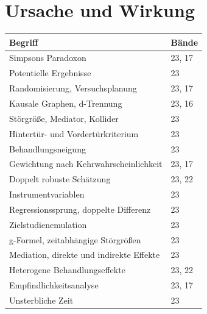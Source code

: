 \section*{Ursache und Wirkung}
\nopagebreak
{\small\renewcommand{\arraystretch}{1.32}
\begin{longtable}{@{}P{5.6cm}P{2.8cm}@{}}
\toprule
\textbf{Begriff} & \textbf{Bände}\\
\midrule
\endhead
Simpsons Paradoxon & 23, 17\\
Potentielle Ergebnisse & 23\\
Randomisierung, Versuchsplanung & 23, 17\\
Kausale Graphen, d-Trennung & 23, 16\\
Störgröße, Mediator, Kollider & 23\\
Hintertür- und Vordertürkriterium & 23\\
Behandlungsneigung & 23\\
Gewichtung nach Kehrwahrscheinlichkeit & 23, 17\\
Doppelt robuste Schätzung & 23, 22\\
Instrumentvariablen & 23\\
Regressionssprung, doppelte Differenz & 23\\
Zielstudienemulation & 23\\
g-Formel, zeitabhängige Störgrößen & 23\\
Mediation, direkte und indirekte Effekte & 23\\
Heterogene Behandlungseffekte & 23, 22\\
Empfindlichkeitsanalyse & 23, 17\\
Unsterbliche Zeit & 23\\
\bottomrule
\end{longtable}}


